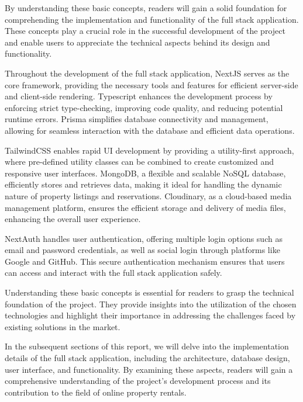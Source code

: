 By understanding these basic concepts, readers will gain a solid foundation for comprehending the implementation and functionality of the full stack application. These concepts play a crucial role in the successful development of the project and enable users to appreciate the technical aspects behind its design and functionality.

Throughout the development of the full stack application, NextJS serves as the core framework, providing the necessary tools and features for efficient server-side and client-side rendering. Typescript enhances the development process by enforcing strict type-checking, improving code quality, and reducing potential runtime errors. Prisma simplifies database connectivity and management, allowing for seamless interaction with the database and efficient data operations.

TailwindCSS enables rapid UI development by providing a utility-first approach, where pre-defined utility classes can be combined to create customized and responsive user interfaces. MongoDB, a flexible and scalable NoSQL database, efficiently stores and retrieves data, making it ideal for handling the dynamic nature of property listings and reservations. Cloudinary, as a cloud-based media management platform, ensures the efficient storage and delivery of media files, enhancing the overall user experience.

NextAuth handles user authentication, offering multiple login options such as email and password credentials, as well as social login through platforms like Google and GitHub. This secure authentication mechanism ensures that users can access and interact with the full stack application safely.

Understanding these basic concepts is essential for readers to grasp the technical foundation of the project. They provide insights into the utilization of the chosen technologies and highlight their importance in addressing the challenges faced by existing solutions in the market.

In the subsequent sections of this report, we will delve into the implementation details of the full stack application, including the architecture, database design, user interface, and functionality. By examining these aspects, readers will gain a comprehensive understanding of the project's development process and its contribution to the field of online property rentals.
